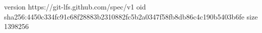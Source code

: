 version https://git-lfs.github.com/spec/v1
oid sha256:4450c334fc91c68f28883b2310882fc5b2a0347f58fb8db86c4c190b5403b6fe
size 1398256
